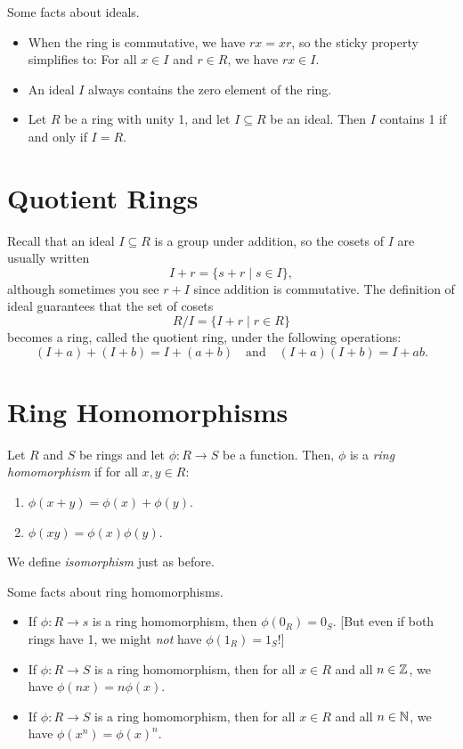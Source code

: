 \begin{facts}
	Some facts about ideals.
	\begin{itemize}
		\item When the ring is commutative, we have $rx = xr$, so the sticky
			property simplifies to: For all $x \in I$ and $r \in R$, we have $rx \in
			I$.
		\item An ideal $I$ always contains the zero element of the ring.
		\item Let $R$ be a ring with unity 1, and let $I \subseteq R$ be an ideal.
			Then $I$ contains 1 if and only if $I = R$.
	\end{itemize}
\end{facts}

\section*{Quotient Rings}

\begin{definition}
	Recall that an ideal $I \subseteq R$ is a group under addition, so the
	cosets of $I$ are usually written
	\[
		I + r = \{s + r \mid s \in I\},
	\]
	although sometimes you see $r + I$ since addition is commutative. The
	definition of ideal guarantees that the set of cosets
	\[
		R/I = \{I + r \mid r \in R\}
	\]
	becomes a ring, called the quotient ring, under the following
	operations:
	\[
		(I + a) + (I + b) = I + (a + b) \quad \text{and} \quad (I + a) (I + b) = I +
		ab.
	\]
\end{definition}

\section*{Ring Homomorphisms}

\begin{definition}
	Let $R$ and $S$ be rings and let $\phi : R \rightarrow S$ be a function. Then,
	$\phi$ is a \emph{ring homomorphism} if for all $x, y \in R$:
	\begin{enumerate}
		\item $\phi(x + y) = \phi(x) + \phi(y)$.
		\item $\phi(xy) = \phi(x) \phi(y)$.
	\end{enumerate}
	We define \emph{isomorphism} just as before.
\end{definition}

\begin{facts}
	Some facts about ring homomorphisms.
	\begin{itemize}
		\item If $\phi : R \rightarrow s$ is a ring homomorphism, then $\phi(0_R) =
			0_S$. [But even if both rings have 1, we might \emph{not} have $\phi(1_R)
			= 1_S$!]
		\item If $\phi : R \rightarrow S$ is a ring homomorphism, then for all $x
			\in R$ and all $n \in {\mathbb{Z}}$, we have $\phi(nx) = n \phi(x)$.
		\item If $\phi : R \rightarrow S$ is a ring homomorphism, then for all $x
			\in R$ and all $n \in {\mathbb{N}}$, we have $\phi(x^n) = {\phi(x)}^n$.
	\end{itemize}
\end{facts}

